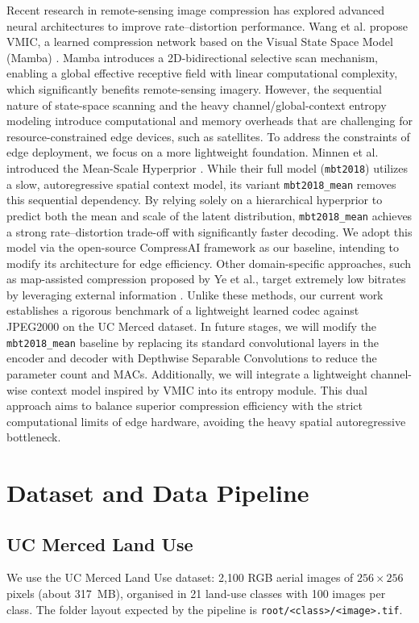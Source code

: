 \documentclass[11pt]{article}
\begin{document}
Recent research in remote-sensing image compression has explored advanced neural architectures to improve rate--distortion performance. 
Wang et al. propose VMIC, a learned compression network based on the Visual State Space Model (Mamba) \citep{wang2025towards}. 
Mamba introduces a 2D-bidirectional selective scan mechanism, enabling a global effective receptive field with linear computational complexity, which significantly benefits remote-sensing imagery. 
However, the sequential nature of state-space scanning and the heavy channel/global-context entropy modeling introduce computational and memory overheads that are challenging for resource-constrained edge devices, such as satellites. 
To address the constraints of edge deployment, we focus on a more lightweight foundation. 
Minnen et al. introduced the Mean-Scale Hyperprior \citep{minnen2018joint}. 
While their full model (\texttt{mbt2018}) utilizes a slow, autoregressive spatial context model, 
its variant \texttt{mbt2018\_mean} removes this sequential dependency. 
By relying solely on a hierarchical hyperprior to predict both the mean and scale 
of the latent distribution, \texttt{mbt2018\_mean} achieves a strong rate--distortion trade-off 
with significantly faster decoding. 
We adopt this model via the open-source CompressAI framework \citep{begaint2020compressai} as our baseline, 
intending to modify its architecture for edge efficiency. 
Other domain-specific approaches, such as map-assisted compression proposed by Ye et al., target extremely low bitrates by leveraging external information \citep{ye2025map}. 
Unlike these methods, our current work establishes a rigorous benchmark of a lightweight learned codec against JPEG2000 on the UC Merced dataset. 
In future stages, we will modify the \texttt{mbt2018\_mean} baseline by replacing its standard convolutional layers in the encoder and decoder with Depthwise Separable Convolutions to reduce the parameter count and MACs. Additionally, we will integrate a lightweight channel-wise context model inspired by VMIC into its entropy module. This dual approach aims to balance superior compression efficiency with the strict computational limits of edge hardware, avoiding the heavy spatial autoregressive bottleneck.


\section{Dataset and Data Pipeline}
\label{sec:data}
\subsection{UC Merced Land Use}
We use the UC Merced Land Use dataset: 2{,}100 RGB aerial images of $256\times256$ pixels (about 317~MB), organised in 21 land-use classes with 100 images per class. The folder layout expected by the pipeline is \texttt{root/<class>/<image>.tif}.
 
\end{document}
